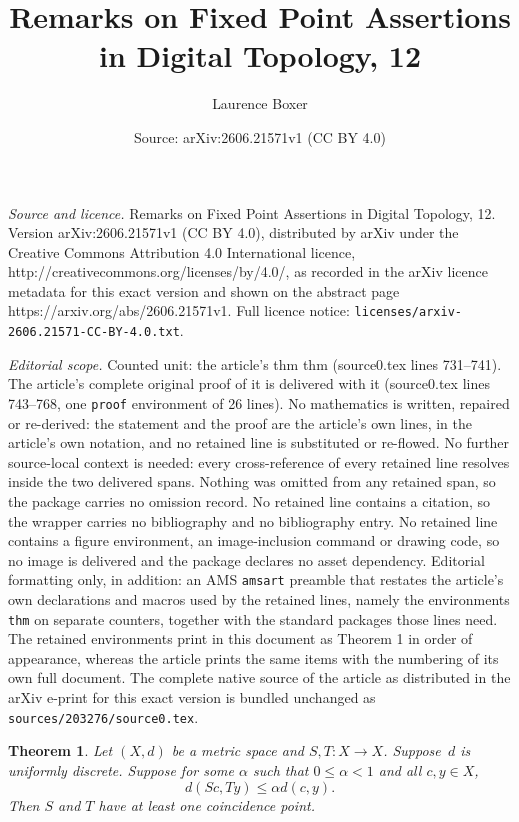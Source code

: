 \documentclass[10pt,a4paper]{amsart}
\title{Remarks on Fixed Point Assertions in Digital Topology, 12}
\author{Laurence Boxer}
\date{Source: arXiv:2606.21571v1 (CC BY 4.0)}
\newtheorem{thm}{Theorem}
\begin{document}
\maketitle

\noindent\emph{Source and licence.} Remarks on Fixed Point Assertions in Digital Topology, 12. Version arXiv:2606.21571v1 (CC BY 4.0), distributed by arXiv under the Creative Commons Attribution 4.0 International licence, http://creativecommons.org/licenses/by/4.0/, as recorded in the arXiv licence metadata for this exact version and shown on the abstract page https://arxiv.org/abs/2606.21571v1. Full licence notice: \texttt{licenses/arxiv-2606.21571-CC-BY-4.0.txt}.\par\smallskip

\noindent\textit{Editorial scope.} Counted unit: the article's thm thm (source0.tex lines 731--741). The article's complete original proof of it is delivered with it (source0.tex lines 743--768, one \texttt{proof} environment of 26 lines). No mathematics is written, repaired or re-derived: the statement and the proof are the article's own lines, in the article's own notation, and no retained line is substituted or re-flowed.  No further source-local context is needed: every cross-reference of every retained line resolves inside the two delivered spans.  Nothing was omitted from any retained span, so the package carries no omission record.  No retained line contains a citation, so the wrapper carries no bibliography and no bibliography entry.  No retained line contains a figure environment, an image-inclusion command or drawing code, so no image is delivered and the package declares no asset dependency.  Editorial formatting only, in addition: an AMS \texttt{amsart} preamble that restates the article's own declarations and macros used by the retained lines, namely the environments \texttt{thm} on separate counters, together with the standard packages those lines need.  The retained environments print in this document as Theorem 1 in order of appearance, whereas the article prints the same items with the numbering of its own full document.  The complete native source of the article as distributed in the arXiv e-print for this exact version is bundled unchanged as \texttt{sources/203276/source0.tex}.
\begin{thm}
    Let $(X,d)$ be a metric space and
    $S,T: X \to X$. Suppose~$d$ is
    uniformly discrete. Suppose
    for some $\alpha$ such that
              $0 \le \alpha < 1$ and
              all $c,y \in X$,
              \[ d(Sc,Ty) \le \alpha d(c,y).\]
    Then $S$ and $T$ have at least one
    coincidence point.
\end{thm}
\end{document}
